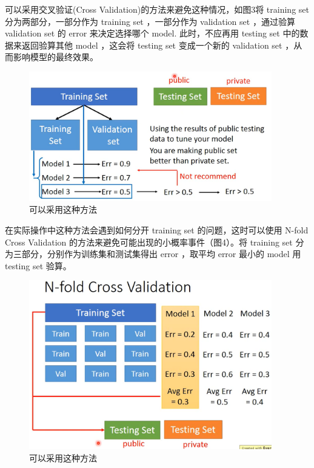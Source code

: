 \documentclass[UTF8,a4paper]{ctexart}
\begin{document}
可以采用交叉验证(Cross Validation)的方法来避免这种情况，如图3将 training set 分为两部分，一部分作为 training set ，一部分作为 validation set ，通过验算 validation set 的 error 来决定选择哪个 model. 此时，不应再用 testing set 中的数据来返回验算其他 model ，这会将 testing set 变成一个新的 validation set ，从而影响模型的最终效果。
\begin{figure}[ht]
\centering
\includegraphics[width=300pt]{rec1.png}
\caption{可以采用这种方法}
\end{figure}

在实际操作中这种方法会遇到如何分开 training set 的问题，这时可以使用 N-fold Cross Validation 的方法来避免可能出现的小概率事件（图4）。将 training set 分为三部分，分别作为训练集和测试集得出 error ，取平均 error 最小的 model 用 testing set 验算。

\newpage
\begin{figure}[ht]
\centering
\includegraphics[width=300pt]{rec2.png}
\caption{可以采用这种方法}
\end{figure}
\end{document}
